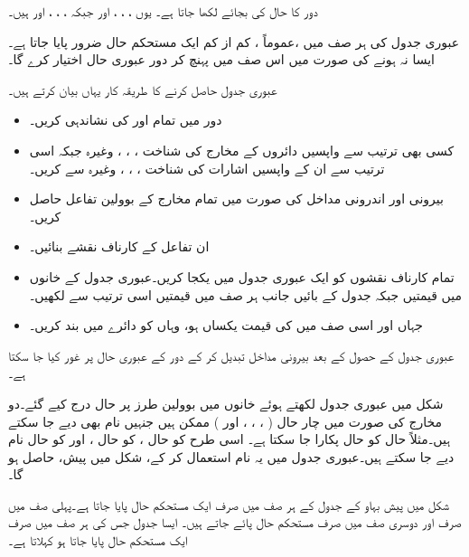  دور کا حال   کی بجائے   لکھا جاتا ہے۔ یوں  ، ، ، اور   جبکہ ، ، ، اور  ہیں۔
 
عبوری جدول کی  ہر صف میں ،عموماً ، کم از کم ایک مستحکم حال ضرور پایا جاتا ہے۔ایسا نہ ہونے کی صورت میں  اس صف میں پہنچ کر  دور  عبوری حال اختیار کرے گا۔

عبوری جدول حاصل کرنے کا طریقہ  کار  یہاں بیان کرتے ہیں۔
\begin{itemize}
\item
دور میں      تمام   اور  کی نشاندہی  کریں۔
\item
 کسی بھی ترتیب سے واپسیں دائروں کے مخارج کی شناخت ، ، ، وغیرہ جبکہ اسی ترتیب سے ان کے واپسیں اشارات کی شناخت ،  ، ،  وغیرہ سے  کریں۔
\item
 بیرونی اور اندرونی مداخل کی صورت میں        تمام مخارج کے بوولین تفاعل حاصل کریں۔
\item    
    ان تفاعل کے کارناف نقشے بنائیں۔
\item 
  تمام کارناف نقشوں کو ایک عبوری جدول میں یکجا کریں۔عبوری جدول کے خانوں میں      قیمتیں جبکہ جدول کے بائیں جانب ہر صف میں    قیمتیں اسی ترتیب سے لکھیں۔
\item    
     جہاں  اور اسی صف میں  کی قیمت یکساں ہو، وہاں  کو دائرے میں بند کریں۔
    \end{itemize}
عبوری جدول کے حصول کے بعد بیرونی مداخل تبدیل کر کے دور کے عبوری حال   پر غور کیا  جا سکتا ہے۔ 

شکل میں عبوری جدول لکھتے   ہوئے  خانوں میں بوولین طرز  پر حال  درج کیے  گئے۔دو مخارج کی صورت میں  چار  حال (  ، ، ، اور  ) ممکن ہیں جنہیں  نام بھی دیے جا سکتے ہیں۔مثلاً حال   کو حال  پکارا جا سکتا ہے۔ اسی طرح  کو حال ،  کو حال ، اور  کو  حال  نام دیے جا سکتے ہیں۔عبوری جدول میں یہ نام استعمال کر کے، شکل   میں پیش،    حاصل ہو گا۔

شکل     میں پیش  بہاو کے جدول کے ہر صف میں صرف ایک  مستحکم حال پایا جاتا  ہے۔پہلی صف میں صرف     اور دوسری صف میں صرف   مستحکم حال  پائے جاتے ہیں۔ ایسا جدول جس  کی ہر  صف میں صرف ایک مستحکم حال  پایا جاتا  ہو  کہلاتا ہے۔

